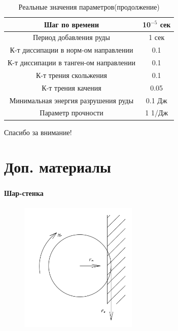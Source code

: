 \documentclass[c]{beamer}  %
\begin{document}
\begin{frame}
\frametitle{\insertsection} 
\framesubtitle{\insertsubsection}

\begin{table}[H]
\caption{Реальные значения параметров(продолжение)}
\begin{tabular}{|c|c|}

\hline
Шаг по времени & 10$^{-5}$ сек \\
\hline
Период добавления руды & 1 сек \\
\hline
К-т диссипации в норм-ом направлении & 0.1 \\
\hline
К-т диссипации в танген-ом направлении & 0.1 \\
\hline
К-т трения скольжения & 0.1 \\
\hline
К-т трения качения & 0.05 \\
\hline
Минимальная энергия разрушения руды & 0.1 Дж \\
\hline
Параметр прочности & 1 1/Дж \\
\hline
\end{tabular}
\end{table}
\end{frame}


















\begin{frame}
\centering
Спасибо за внимание!
\end{frame}

\section{Доп. материалы}

\begin{frame}
\frametitle{\insertsection} 
\framesubtitle{Шар-стенка}

\begin{figure}[h!]
	\centering
	\includegraphics[width=0.5\textwidth]{ball_wall}
\end{figure} 
\end{frame}
\end{document}
